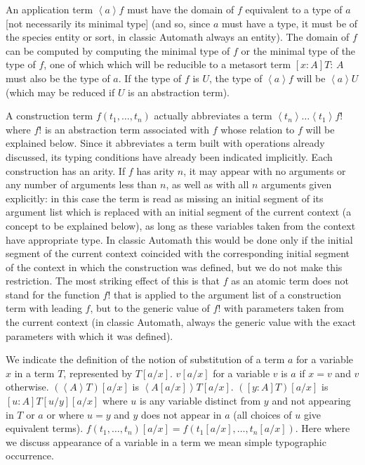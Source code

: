 \documentclass[12pt]{article}
\begin{document}
An application term $\left<a\right>f$ must have the domain of $f$ equivalent to a  type of $a$ [not necessarily its minimal type] (and so, since $a$ must have a type, it must be of the species entity or sort, in classic Automath always an entity).  The domain of $f$ can be computed by computing the minimal type of $f$ or the minimal type of the type of $f$, one of which which will be reducible to a metasort term $[x:A]T$:  $A$ must also be the type of $a$.  If the type of $f$ is $U$, the type of $\left<a\right>f$ will be $\left<a\right>U$ (which may be reduced if $U$ is an abstraction term).

A construction term $f(t_1,\ldots,t_n)$ actually abbreviates a term $\left<t_n\right>\ldots\left<t_1\right>f!$ where $f!$ is an abstraction term associated with $f$ whose relation to $f$ will be explained below.  Since it abbreviates a term built with operations already discussed, its typing conditions have already been indicated implicitly.  Each construction has an arity.  If $f$ has arity $n$, it may appear with no arguments or any number of arguments less than $n$, as well as with all $n$ arguments given explicitly:  in this case the term is read as missing an initial segment of its argument list which is replaced with an initial segment of the current context (a concept to be explained below), as long as these variables taken from the context have appropriate type.  In classic Automath this would be done only  if the initial segment of the current context coincided with the corresponding initial segment of the context in which the construction was defined, but we do not make this restriction.   The most striking effect of this is that $f$ as an atomic term does not stand for the function $f!$ that is applied to the argument list of a construction term with leading $f$, but to the generic value of $f!$ with parameters taken from the current context (in classic Automath, always the generic value with the exact parameters with which it was defined).

We indicate the definition of the notion of substitution of a term $a$ for a variable $x$ in a term $T$, represented by $T[a/x]$.  $v[a/x]$ for a variable $v$ is $a$ if $x=v$ and $v$ otherwise.
$(\left<A\right>T)[a/x]$ is $\left<A[a/x]\right>T[a/x]$.  $([y:A]T)[a/x]$ is $[u:A]T[u/y][a/x]$ where $u$ is any variable distinct from $y$ and not appearing in $T$ or $a$ or where $u=y$ and $y$ does not appear in $a$  (all choices of $u$ give equivalent terms).  $f(t_1,\ldots,t_n)[a/x] = f(t_1[a/x],\ldots,t_n[a/x])$.  Here where we discuss appearance of a variable in a term we mean simple typographic occurrence.
\end{document}
